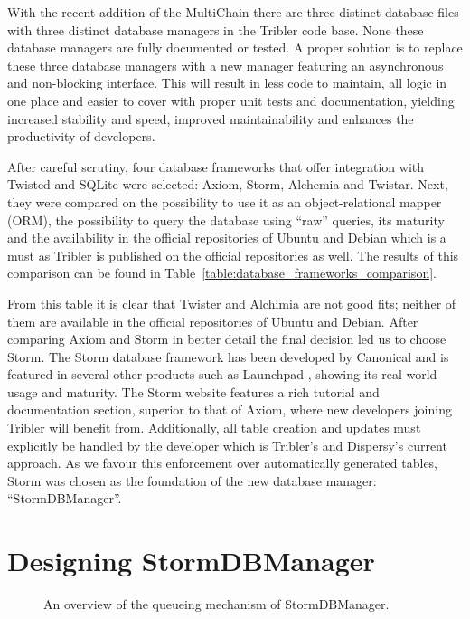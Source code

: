 With the recent addition of the MultiChain there are three distinct database files with three distinct database managers in the Tribler code base.
None these database managers are fully documented or tested.
A proper solution is to replace these three database managers with a new manager featuring an asynchronous and non-blocking interface.
This will result in less code to maintain, all logic in one place and easier to cover with proper unit tests and documentation, yielding increased stability and speed, improved maintainability and enhances the productivity of developers.

After careful scrutiny, four database frameworks that offer integration with Twisted and SQLite were selected: Axiom, Storm, Alchemia and Twistar.
Next, they were compared on the possibility to use it as an object-relational mapper (ORM), the possibility to query the database using \enquote{raw} queries, its maturity and the availability in the official repositories of Ubuntu and Debian which is a must as Tribler is published on the official repositories as well.
The results of this comparison can be found in Table~\ref{table:database_frameworks_comparison}.

From this table it is clear that Twister and Alchimia are not good fits; neither of them are available in the official repositories of Ubuntu and Debian.
After comparing Axiom and Storm in better detail the final decision led us to choose Storm.
The Storm database framework has been developed by Canonical and is featured in several other products such as Launchpad \cite{canonical2011storm}, showing its real world usage and maturity.
The Storm website features a rich tutorial and documentation section, superior to that of Axiom, where new developers joining Tribler will benefit from.
Additionally, all table creation and updates must explicitly be handled by the developer which is Tribler's and Dispersy's current approach.
As we favour this enforcement over automatically generated tables, Storm was chosen as the foundation of the new database manager: \enquote{StormDBManager}.

\section{Designing StormDBManager}

\begin{figure}[h]
	\caption{An overview of the queueing mechanism of StormDBManager.}
	\label{fig:storm_db_worker}
\end{figure}

